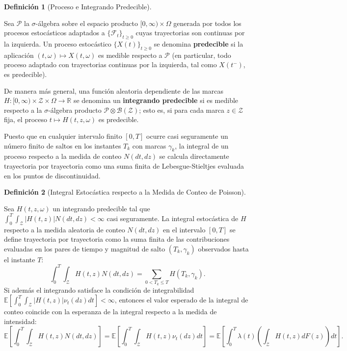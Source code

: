 \documentclass[
  spanish,
  us-letterpaper,
]{scrreprt}
\numberwithin{equation}{section}
\theoremstyle{plain}
\theoremstyle{plain}
\theoremstyle{plain}
\theoremstyle{definition}
\newtheorem{definition}{Definición}[chapter]
\theoremstyle{remark}
\begin{document}
\begin{definition}[Proceso e Integrando
Predecible]\protect\hypertarget{def-proceso-predecible}{}\label{def-proceso-predecible}

Sea \(\mathcal{P}\) la \(\sigma\)-álgebra sobre el espacio producto
\([0, \infty) \times \Omega\) generada por todos los procesos
estocásticos adaptados a \(\{\mathcal{F}_t\}_{t \ge 0}\) cuyas
trayectorias son continuas por la izquierda. Un proceso estocástico
\(\{X(t)\}_{t \ge 0}\) se denomina \textbf{predecible} si la aplicación
\((t, \omega) \mapsto X(t, \omega)\) es medible respecto a
\(\mathcal{P}\) (en particular, todo proceso adaptado con trayectorias
continuas por la izquierda, tal como \(X(t^-)\), es predecible).

De manera más general, una función aleatoria dependiente de las marcas
\(H: [0, \infty) \times \mathcal{Z} \times \Omega \to \mathbb{R}\) se
denomina un \textbf{integrando predecible} si es medible respecto a la
\(\sigma\)-álgebra producto
\(\mathcal{P} \otimes \mathcal{B}(\mathcal{Z})\); esto es, si para cada
marca \(z \in \mathcal{Z}\) fija, el proceso
\(t \mapsto H(t, z, \omega)\) es predecible.

\end{definition}

Puesto que en cualquier intervalo finito \([0, T]\) ocurre casi
seguramente un número finito de saltos en los instantes \(T_k\) con
marcas \(\gamma_k\), la integral de un proceso respecto a la medida de
conteo \(N(dt, dz)\) se calcula directamente trayectoria por trayectoria
como una suma finita de Lebesgue-Stieltjes evaluada en los puntos de
discontinuidad.

\begin{definition}[Integral Estocástica respecto a la Medida de Conteo
de
Poisson]\protect\hypertarget{def-integral-conteo}{}\label{def-integral-conteo}

Sea \(H(t, z, \omega)\) un integrando predecible tal que
\(\displaystyle \int_0^T \int_{\mathcal{Z}} \vert H(t, z) \vert N(dt, dz) < \infty\)
casi seguramente. La integral estocástica de \(H\) respecto a la medida
aleatoria de conteo \(N(dt, dz)\) en el intervalo \([0, T]\) se define
trayectoria por trayectoria como la suma finita de las contribuciones
evaluadas en los pares de tiempo y magnitud de salto \((T_k, \gamma_k)\)
observados hasta el instante \(T\): \[
\int_0^T \int_{\mathcal{Z}} H(t, z) N(dt, dz) = \sum_{0 < T_k \le T} H(T_k, \gamma_k).
\] Si además el integrando satisface la condición de integrabilidad
\(\mathbb{E}\left[ \displaystyle \int_0^T \int_{\mathcal{Z}} \vert H(t, z) \vert \nu_t(dz) dt \right] < \infty\),
entonces el valor esperado de la integral de conteo coincide con la
esperanza de la integral respecto a la medida de intensidad: \[
\mathbb{E}\left[ \int_0^T \int_{\mathcal{Z}} H(t, z) N(dt, dz) \right] = \mathbb{E}\left[ \int_0^T \int_{\mathcal{Z}} H(t, z) \nu_t(dz) dt \right] = \mathbb{E}\left[ \int_0^T \lambda(t) \left( \int_{\mathcal{Z}} H(t, z) dF(z) \right) dt \right].
\]

\end{definition}
\end{document}
